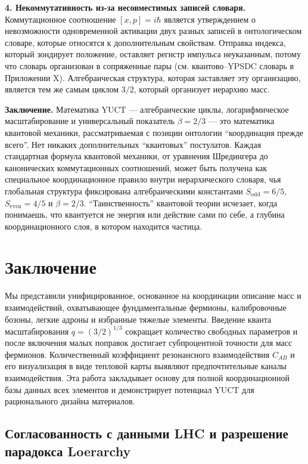 \documentclass[11pt,a4paper]{article}
\begin{document}
	\medskip
	\noindent\textbf{4. Некоммутативность из-за несовместимых записей словаря.}
	Коммутационное соотношение $[x,p]=i\hbar$ является утверждением о невозможности одновременной активации двух разных записей в онтологическом словаре, которые относятся к дополнительным свойствам. Отправка индекса, который зондирует положение, оставляет регистр импульса неуказанным, потому что словарь организован в сопряженные пары (см. квантово–YPSDC словарь в Приложении X). Алгебраическая структура, которая заставляет эту организацию, является тем же самым циклом $3/2$, который организует иерархию масс.
	
	\medskip
	\noindent
	\textbf{Заключение.} Математика YUCT — алгебраические циклы, логарифмическое масштабирование и универсальный показатель $\beta=2/3$ — это математика квантовой механики, рассматриваемая с позиции онтологии ``координация прежде всего''. Нет никаких дополнительных ``квантовых'' постулатов. Каждая стандартная формула квантовой механики, от уравнения Шредингера до канонических коммутационных соотношений, может быть получена как специальное координационное правило внутри иерархического словаря, чья глобальная структура фиксирована алгебраическими константами $S_{\mathrm{odd}}=6/5$, $S_{\mathrm{even}}=4/5$ и $\beta=2/3$. ``Таинственность'' квантовой теории исчезает, когда понимаешь, что квантуется не энергия или действие сами по себе, а глубина координационного слоя, в котором находится частица.
	
	\section{Заключение}
	\label{sec:conclusion}
	
	Мы представили унифицированное, основанное на координации описание масс и взаимодействий, охватывающее фундаментальные фермионы, калибровочные бозоны, легкие адроны и избранные тяжелые элементы. Введение кванта масштабирования \(q = (3/2)^{1/3}\) сокращает количество свободных параметров и после включения малых поправок достигает субпроцентной точности для масс фермионов. Количественный коэффициент резонансного взаимодействия \(C_{AB}\) и его визуализация в виде тепловой карты выявляют предпочтительные каналы взаимодействия. Эта работа закладывает основу для полной координационной базы данных всех элементов и демонстрирует потенциал YUCT для рационального дизайна материалов.
	
	\subsection{Согласованность с данными LHC и разрешение парадокса Loerarchy}
	
\end{document}
